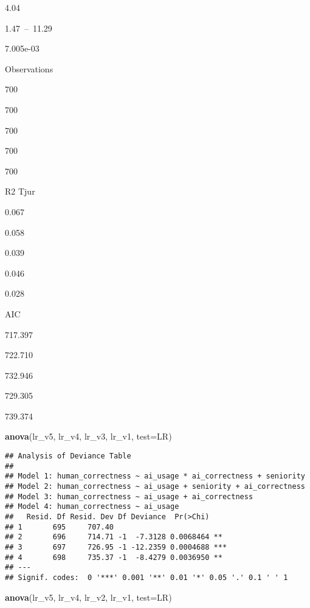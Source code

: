 \documentclass[
]{article}
\newenvironment{Shaded}{\begin{snugshade}}{\end{snugshade}}
\newcommand{\AttributeTok}[1]{\textcolor[rgb]{0.13,0.29,0.53}{#1}}
\newcommand{\FunctionTok}[1]{\textcolor[rgb]{0.13,0.29,0.53}{\textbf{#1}}}
\newcommand{\NormalTok}[1]{#1}
\newcommand{\StringTok}[1]{\textcolor[rgb]{0.31,0.60,0.02}{#1}}
\begin{document}
4.04

1.47~--~11.29

7.005e-03

Observations

700

700

700

700

700

R2 Tjur

0.067

0.058

0.039

0.046

0.028

AIC

717.397

722.710

732.946

729.305

739.374

\begin{Shaded}
\begin{Highlighting}[]
\FunctionTok{anova}\NormalTok{(lr\_v5, lr\_v4, lr\_v3, lr\_v1, }\AttributeTok{test=}\StringTok{\textquotesingle{}LR\textquotesingle{}}\NormalTok{)}
\end{Highlighting}
\end{Shaded}

\begin{verbatim}
## Analysis of Deviance Table
## 
## Model 1: human_correctness ~ ai_usage * ai_correctness + seniority
## Model 2: human_correctness ~ ai_usage + seniority + ai_correctness
## Model 3: human_correctness ~ ai_usage + ai_correctness
## Model 4: human_correctness ~ ai_usage
##   Resid. Df Resid. Dev Df Deviance  Pr(>Chi)    
## 1       695     707.40                          
## 2       696     714.71 -1  -7.3128 0.0068464 ** 
## 3       697     726.95 -1 -12.2359 0.0004688 ***
## 4       698     735.37 -1  -8.4279 0.0036950 ** 
## ---
## Signif. codes:  0 '***' 0.001 '**' 0.01 '*' 0.05 '.' 0.1 ' ' 1
\end{verbatim}

\begin{Shaded}
\begin{Highlighting}[]
\FunctionTok{anova}\NormalTok{(lr\_v5, lr\_v4, lr\_v2, lr\_v1, }\AttributeTok{test=}\StringTok{\textquotesingle{}LR\textquotesingle{}}\NormalTok{)}
\end{Highlighting}
\end{Shaded}
\end{document}
